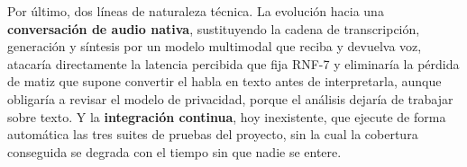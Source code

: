 Por último, dos líneas de naturaleza técnica. La evolución hacia una \textbf{conversación de audio nativa},
sustituyendo la cadena de transcripción, generación y síntesis por un modelo multimodal que reciba y devuelva
voz, atacaría directamente la latencia percibida que fija RNF-7 y eliminaría la pérdida de matiz que supone
convertir el habla en texto antes de interpretarla, aunque obligaría a revisar el modelo de privacidad,
porque el análisis dejaría de trabajar sobre texto. Y la \textbf{integración continua}, hoy inexistente, que
ejecute de forma automática las tres suites de pruebas del proyecto, sin la cual la cobertura conseguida se
degrada con el tiempo sin que nadie se entere.
